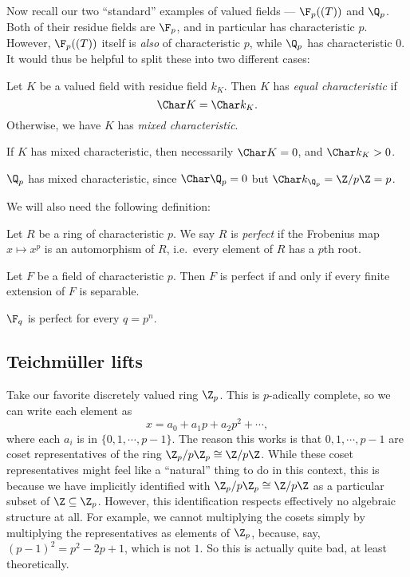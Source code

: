 \documentclass[a4paper]{article}
\begin{document}
Now recall our two ``standard'' examples of valued fields --- $\F_p((T))$ and $\Q_p$. Both of their residue fields are $\F_p$, and in particular has characteristic $p$. However, $\F_p((T))$ itself is \emph{also} of characteristic $p$, while $\Q_p$ has characteristic $0$. It would thus be helpful to split these into two different cases:

\begin{defi}
  Let $K$ be a valued field with residue field $k_K$. Then $K$ has \emph{equal characteristic} if
  \[
    \Char K = \Char k_K.
  \]
  Otherwise, we have $K$ has \emph{mixed characteristic}.
\end{defi}
If $K$ has mixed characteristic, then necessarily $\Char K = 0$, and $\Char k_K > 0$.

\begin{eg}
  $\Q_p$ has mixed characteristic, since $\Char \Q_p = 0$ but $\Char k_{\Q_p} = \Z/p\Z = p$.
\end{eg}

We will also need the following definition:
\begin{defi}
  Let $R$ be a ring of characteristic $p$. We say $R$ is \emph{perfect} if the Frobenius map $x \mapsto x^p$ is an automorphism of $R$, i.e.\ every element of $R$ has a $p$th root.
\end{defi}

\begin{fact}
  Let $F$ be a field of characteristic $p$. Then $F$ is perfect if and only if every finite extension of $F$ is separable.
\end{fact}

\begin{eg}
  $\F_q$ is perfect for every $q = p^n$.
\end{eg}

\subsection{\texorpdfstring{Teichm\"uller}{Teichm\"uller} lifts}
Take our favorite discretely valued ring $\Z_p$. This is $p$-adically complete, so we can write each element as
\[
  x = a_0 + a_1 p + a_2 p^2 + \cdots,
\]
where each $a_i$ is in $\{0, 1, \cdots, p - 1\}$. The reason this works is that $0, 1, \cdots, p - 1$ are coset representatives of the ring $\Z_p/p \Z_p \cong \Z/p\Z$. While these coset representatives might feel like a ``natural'' thing to do in this context, this is because we have implicitly identified with $\Z_p/p\Z_p \cong \Z/p\Z$ as a particular subset of $\Z \subseteq \Z_p$. However, this identification respects effectively no algebraic structure at all. For example, we cannot multiplying the cosets simply by multiplying the representatives as elements of $\Z_p$, because, say, $(p - 1)^2 = p^2 - 2p + 1$, which is not $1$. So this is actually quite bad, at least theoretically.
\end{document}

